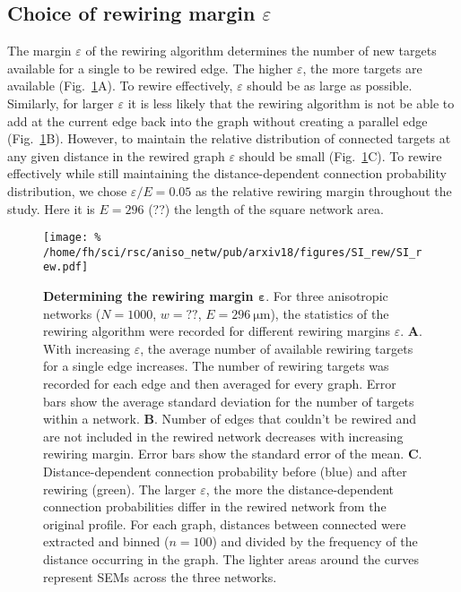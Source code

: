 
\subsection{Choice of rewiring margin $\varepsilon$}

The margin $\varepsilon$ of the rewiring algorithm determines the number of new targets available for a single to be rewired edge. The higher $\varepsilon$, the more targets are available (Fig.~\ref{fig:rew-ddcp-ef}A). To rewire effectively, $\varepsilon$ should be as large as possible. Similarly, for larger $\varepsilon$ it is less likely that the rewiring algorithm is not be able to add at the current edge back into the graph without creating a parallel edge (Fig.~\ref{fig:rew-ddcp-ef}B). However, to maintain the relative distribution of connected targets at any given distance in the rewired graph $\varepsilon$ should be small (Fig.~\ref{fig:rew-ddcp-ef}C). To rewire effectively while still maintaining the distance-dependent connection probability distribution, we chose $\varepsilon/E = 0.05$ as the relative rewiring margin throughout the study. Here it is $E=296$ (??) the length of the square network area.

\addtocounter{subsection}{1}
\begin{figure}[h!]
  \texttt{[image: \%
    /home/fh/sci/rsc/aniso\_netw/pub/arxiv18/figures/SI\_rew/SI\_rew.pdf]}
  \caption{\textbf{Determining the rewiring margin $\bm{\varepsilon}$}. For three anisotropic networks ($N=1000$, $w=??$, $E=\SI{296}{\micro\meter}$), the statistics of the rewiring algorithm were recorded for different rewiring margins $\varepsilon$.
    \textbf{A}. With increasing $\varepsilon$, the average number of available rewiring targets for a single edge increases. The number of rewiring targets was recorded for each edge and then averaged for every graph. Error bars show the average standard deviation for the number of targets within a network.
    \textbf{B}. Number of edges that couldn't be rewired and are not included in the rewired network decreases with increasing rewiring margin. Error bars show the standard error of the mean. \textbf{C}. Distance-dependent connection probability before (blue) and after rewiring (green). The larger $\varepsilon$, the more the distance-dependent connection probabilities differ in the rewired network from the original profile. For each graph, distances between connected were extracted and binned ($n=100$) and divided by the frequency of the distance occurring in the graph. The lighter areas around the curves represent SEMs across the three networks.}
  \label{fig:rew-ddcp-ef}
  \end{figure}
